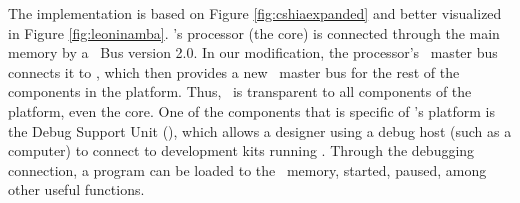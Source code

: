 The implementation is based on Figure \ref{fig:cshiaexpanded} and better visualized in Figure \ref{fig:leoninamba}. \leon's processor (the core) is connected through the main memory by a \amba~Bus version 2.0. In our modification, the processor's \io~master bus connects it to \handler, which then provides a new \io~master bus for the rest of the components in the platform. Thus, \handler~is transparent to all components of the platform, even the core. One of the components that is specific of \leon's platform is the Debug Support Unit (\dsu), which allows a designer using a debug host (such as a computer) to connect to development kits running \leon. Through the debugging connection, a program can be loaded to the \fpga~memory, started, paused, among other useful functions.



